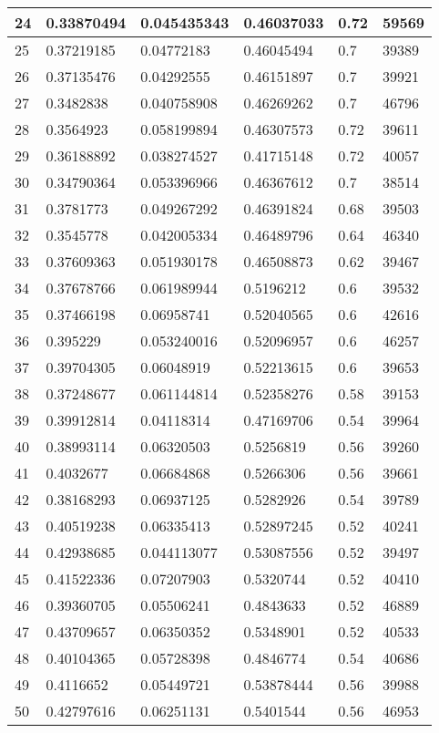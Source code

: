 \begin{longtable}{|l|l|l|l|l|l|}
24 & 0.33870494 & 0.045435343 & 0.46037033 & 0.72 & 59569 \\ \hline 
25 & 0.37219185 & 0.04772183 & 0.46045494 & 0.7 & 39389 \\ \hline 
26 & 0.37135476 & 0.04292555 & 0.46151897 & 0.7 & 39921 \\ \hline 
27 & 0.3482838 & 0.040758908 & 0.46269262 & 0.7 & 46796 \\ \hline 
28 & 0.3564923 & 0.058199894 & 0.46307573 & 0.72 & 39611 \\ \hline 
29 & 0.36188892 & 0.038274527 & 0.41715148 & 0.72 & 40057 \\ \hline 
30 & 0.34790364 & 0.053396966 & 0.46367612 & 0.7 & 38514 \\ \hline 
31 & 0.3781773 & 0.049267292 & 0.46391824 & 0.68 & 39503 \\ \hline 
32 & 0.3545778 & 0.042005334 & 0.46489796 & 0.64 & 46340 \\ \hline 
33 & 0.37609363 & 0.051930178 & 0.46508873 & 0.62 & 39467 \\ \hline 
34 & 0.37678766 & 0.061989944 & 0.5196212 & 0.6 & 39532 \\ \hline 
35 & 0.37466198 & 0.06958741 & 0.52040565 & 0.6 & 42616 \\ \hline 
36 & 0.395229 & 0.053240016 & 0.52096957 & 0.6 & 46257 \\ \hline 
37 & 0.39704305 & 0.06048919 & 0.52213615 & 0.6 & 39653 \\ \hline 
38 & 0.37248677 & 0.061144814 & 0.52358276 & 0.58 & 39153 \\ \hline 
39 & 0.39912814 & 0.04118314 & 0.47169706 & 0.54 & 39964 \\ \hline 
40 & 0.38993114 & 0.06320503 & 0.5256819 & 0.56 & 39260 \\ \hline 
41 & 0.4032677 & 0.06684868 & 0.5266306 & 0.56 & 39661 \\ \hline 
42 & 0.38168293 & 0.06937125 & 0.5282926 & 0.54 & 39789 \\ \hline 
43 & 0.40519238 & 0.06335413 & 0.52897245 & 0.52 & 40241 \\ \hline 
44 & 0.42938685 & 0.044113077 & 0.53087556 & 0.52 & 39497 \\ \hline 
45 & 0.41522336 & 0.07207903 & 0.5320744 & 0.52 & 40410 \\ \hline 
46 & 0.39360705 & 0.05506241 & 0.4843633 & 0.52 & 46889 \\ \hline 
47 & 0.43709657 & 0.06350352 & 0.5348901 & 0.52 & 40533 \\ \hline 
48 & 0.40104365 & 0.05728398 & 0.4846774 & 0.54 & 40686 \\ \hline 
49 & 0.4116652 & 0.05449721 & 0.53878444 & 0.56 & 39988 \\ \hline 
50 & 0.42797616 & 0.06251131 & 0.5401544 & 0.56 & 46953 \\ \hline 
\end{longtable}